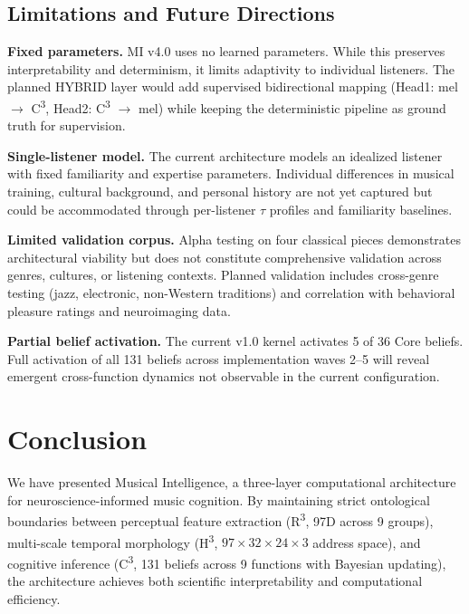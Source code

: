 \documentclass[10pt,twocolumn]{article}
\newcommand{\Rcube}{R\textsuperscript{3}}
\newcommand{\Hcube}{H\textsuperscript{3}}
\newcommand{\Ccube}{C\textsuperscript{3}}
\begin{document}
\subsection{Limitations and Future Directions}

\textbf{Fixed parameters.}
MI v4.0 uses no learned parameters.
While this preserves interpretability and determinism, it limits adaptivity to individual listeners.
The planned HYBRID layer would add supervised bidirectional mapping (Head1: mel $\rightarrow$ \Ccube{}, Head2: \Ccube{} $\rightarrow$ mel) while keeping the deterministic pipeline as ground truth for supervision.

\textbf{Single-listener model.}
The current architecture models an idealized listener with fixed familiarity and expertise parameters.
Individual differences in musical training, cultural background, and personal history are not yet captured but could be accommodated through per-listener $\tau$ profiles and familiarity baselines.

\textbf{Limited validation corpus.}
Alpha testing on four classical pieces demonstrates architectural viability but does not constitute comprehensive validation across genres, cultures, or listening contexts.
Planned validation includes cross-genre testing (jazz, electronic, non-Western traditions) and correlation with behavioral pleasure ratings and neuroimaging data.

\textbf{Partial belief activation.}
The current v1.0 kernel activates 5 of 36 Core beliefs.
Full activation of all 131 beliefs across implementation waves 2--5 will reveal emergent cross-function dynamics not observable in the current configuration.

\section{Conclusion}
\label{sec:conclusion}

We have presented Musical Intelligence, a three-layer computational architecture for neuroscience-informed music cognition.
By maintaining strict ontological boundaries between perceptual feature extraction (\Rcube{}, 97D across 9 groups), multi-scale temporal morphology (\Hcube{}, $97 \times 32 \times 24 \times 3$ address space), and cognitive inference (\Ccube{}, 131 beliefs across 9 functions with Bayesian updating), the architecture achieves both scientific interpretability and computational efficiency.
\end{document}

